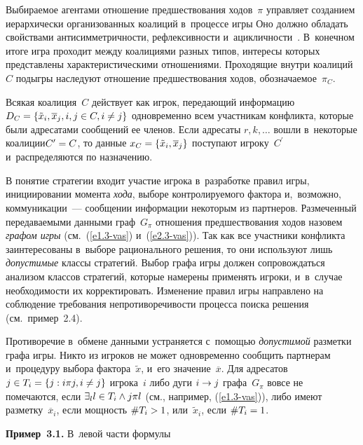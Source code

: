 \begin{multicols}{2}
    Выбираемое агентами отношение предшествования ходов~$\pi$ управ\-ля\-ет 
созданием иерархически организованных коалиций в~процессе игры Оно должно 
обладать свойствами ан\-ти\-сим\-мет\-рич\-ности, реф\-лек\-сив\-ности 
    и~ацик\-лич\-ности~\cite{5-vas}. В~конечном итоге игра проходит между 
коалициями разных типов, интересы которых пред\-став\-ле\-ны характеристическими 
отношениями. Проходящие внут\-ри коалиций~$C$ подыгры наследуют отношение 
предшествования ходов, обозна\-ча\-емое~$\pi_C$.
    
    Всякая коалиция~$C$ действует как игрок, пе\-ре\-да\-ющий информацию 
$D_C\hm= \left\{ \tilde{x}_i, \overline{x}_j, i,j\hm\in C, i\not=j\right\}$ одновременно 
всем участникам конфликта, которые были адресатами сообщений ее членов. Если 
адресаты $r,k,\ldots$ вошли в~некоторые коалиции\linebreak $C^\prime\hm= C$, то данные 
$x_C\hm= \left\{ \tilde{x}_i,\overline{x}_j\right\}$ по\-сту\-па\-ют игроку~$C^\prime$ 
и~распределяются по на\-зна\-че\-нию. 
    
    В понятие стратегии входит участие игрока в~разработке правил игры, 
ини\-ци\-иро\-ва\-нии момента \textit{хода}, выборе конт\-ро\-ли\-ру\-емо\-го фак\-то\-ра 
и,~воз\-мож\-но, коммуникации~--- сообщении информации некоторым из партнеров. 
Размеченный пе\-ре\-да\-ва\-емы\-ми данными граф~$G_\pi$ отношения предшествования 
ходов назовем \textit{графом игры} (см.~(\ref{e1.3-vas}) и~(\ref{e2.3-vas})). Так как все 
участники конфликта заинтересованы в~выборе рационального решения, то они 
используют лишь \textit{допустимые} клас\-сы стратегий. Выбор графа игры должен 
сопровождаться анализом клас\-сов стратегий, которые намерены применять игроки, 
и~в~случае не\-об\-хо\-ди\-мости их корректировать. Изменение правил игры направлено 
на соблюдение требования не\-про\-ти\-во\-ре\-чи\-вости процесса поиска решения (см.\
пример~2.4). 
    
    Противоречие в~обмене данными устраняется с~по\-мощью \textit{допустимой} 
разметки графа игры. Никто из игроков не может одновременно сообщить 
парт\-не\-рам и~процедуру выбора фактора~$\tilde{x}$, и~его значение~$\overline{x}$. 
Для адресатов $j\hm\in T_i \hm= \{j: i\pi j, i\not=j\}$ игрока~$i$ либо дуги $i\hm\to j$ 
графа~$G_\pi$ вовсе не помечаются, если $\exists_l l\hm\in T_i \wedge j\pi l$ (см., 
например, (\ref{e1.3-vas})), либо имеют раз\-мет\-ку~$\overline{x}_i$, если мощ\-ность 
$\# T_i\hm>1$, или~$\tilde{x}_i$, если $\# T_i\hm=1$. 
    
    \textbf{Пример~3.1.} В~левой час\-ти формулы
    

\end{multicols}

